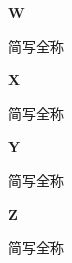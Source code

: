 \noindent\textbf{\LARGE W}
\begin{tabbing}
    简写\qquad\qquad\qquad\= 全称 \kill
\end{tabbing}

\noindent\textbf{\LARGE X}
\begin{tabbing}
    简写\qquad\qquad\qquad\= 全称 \kill
\end{tabbing}

\noindent\textbf{\LARGE Y}
\begin{tabbing}
    简写\qquad\qquad\qquad\= 全称 \kill
\end{tabbing}

\noindent\textbf{\LARGE Z}
\begin{tabbing}
    简写\qquad\qquad\qquad\= 全称 \kill
\end{tabbing}


